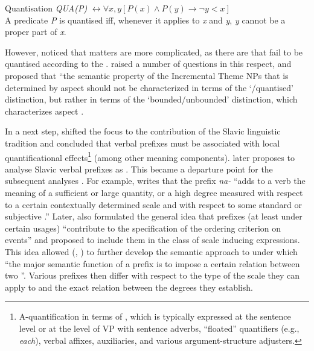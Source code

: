 \theoremstyle{definition}
\begin{definition}{Quantisation}\label{def:quant}
\textit{QUA(P)} $\leftrightarrow \forall x,y[P(x) \wedge P(y) \rightarrow \neg y<x]$\\
A predicate \textit{P} is quantised iff, whenever it applies to \textit{x} and \textit{y}, \textit{y} cannot be a proper part of \textit{x}.
\end{definition}

However, \citet{Filip:92} noticed that matters are more complicated, as there are  that fail to be quantised according to the . \citet{Filip:92} raised a number of questions in this respect, and proposed that ``the semantic property of the Incremental Theme NPs that is determined by aspect should not be characterized in terms of the `/quantised' distinction, but rather in terms of the `bounded/unbounded' distinction, which characterizes aspect \citep[][147]{Filip:92}.

In a next step, \citet{Filip:92} shifted the focus to the contribution of the Slavic linguistic tradition \citep{Wierzbicka:67, Rassudova:75, Merrill:85} and concluded that verbal prefixes must be associated with local quantificational effects\footnote{A-quantification in terms of \citealt{BachPartee:87, BachPartee:95}, which is typically expressed at the sentence level or at the level of VP with sentence adverbs, ``floated'' quantifiers (e.g., \textit{each}), verbal affixes, auxiliaries, and various argument-structure adjusters.} (among other meaning components). \citet{Filip:99} later proposes to analyse Slavic verbal prefixes as . This became a departure point for the subsequent analyses \citep{Filip:00, Filip:03, Filip:05, FilipRothstein:05, Kagan:11, Kagan:12, Kagan:13, Kagan:book}. For example, \citet[183]{Filip:99} writes that the prefix \textit{na-} ``adds to a verb the meaning of a sufficient or large quantity, or a high degree measured with respect to a certain contextually determined scale and with respect to some standard or subjective .'' Later, \citet{Filip:08} also formulated the general idea that prefixes (at least under certain usages) ``contribute to the specification of the ordering criterion on events'' and proposed to include them in the class of scale inducing expressions. This idea allowed \citeauthor{Kagan:12} (\citeyear{Kagan:12}, \citeyear{Kagan:book}) to further develop the semantic approach to  under which ``the major semantic function of a prefix is to impose a certain relation between two ''. Various prefixes then differ with respect to the type of the scale they can apply to and the exact relation between the degrees  they establish. 

